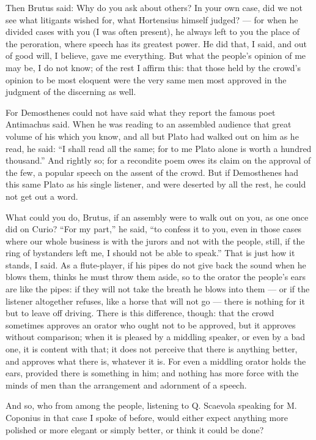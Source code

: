  Then Brutus said: Why do you ask about others? In your own case, did we not see what litigants wished for, what Hortensius himself judged? — for when he divided cases with you (I was often present), he always left to you the place of the peroration, where speech has its greatest power. He did that, I said, and out of good will, I believe, gave me everything. But what the people's opinion of me may be, I do not know; of the rest I affirm this: that those held by the crowd's opinion to be most eloquent were the very same men most approved in the judgment of the discerning as well.

 For Demosthenes could not have said what they report the famous poet Antimachus said. When he was reading to an assembled audience that great volume of his which you know, and all but Plato had walked out on him as he read, he said: ``I shall read all the same; for to me Plato alone is worth a hundred thousand.'' And rightly so; for a recondite poem owes its claim on the approval of the few, a popular speech on the assent of the crowd. But if Demosthenes had this same Plato as his single listener, and were deserted by all the rest, he could not get out a word.

 What could you do, Brutus, if an assembly were to walk out on you, as one once did on Curio? ``For my part,'' he said, ``to confess it to you, even in those cases where our whole business is with the jurors and not with the people, still, if the ring of bystanders left me, I should not be able to speak.'' That is just how it stands, I said. As a flute-player, if his pipes do not give back the sound when he blows them, thinks he must throw them aside, so to the orator the people's ears are like the pipes: if they will not take the breath he blows into them — or if the listener altogether refuses, like a horse that will not go — there is nothing for it but to leave off driving. There is this difference, though: that the crowd sometimes approves an orator who ought not to be approved, but it approves without comparison; when it is pleased by a middling speaker, or even by a bad one, it is content with that; it does not perceive that there is anything better, and approves what there is, whatever it is. For even a middling orator holds the ears, provided there is something in him; and nothing has more force with the minds of men than the arrangement and adornment of a speech.

 And so, who from among the people, listening to Q. Scaevola speaking for M. Coponius in that case I spoke of before, would either expect anything more polished or more elegant or simply better, or think it could be done?

